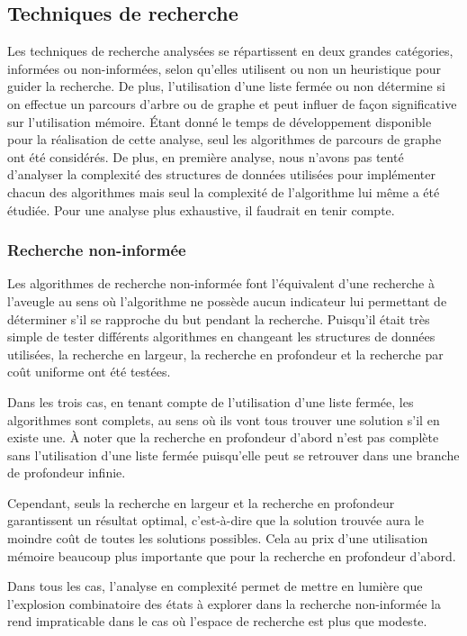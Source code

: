 \documentclass[12pt,english,frenchb,letterpaper]{article}
\begin{document}
\subsection{Techniques de recherche}
Les techniques de recherche analysées se répartissent en deux grandes catégories, informées ou non-informées, selon qu'elles utilisent ou non un heuristique pour guider la recherche.  De plus, l'utilisation d'une liste fermée ou non détermine si on effectue un parcours d'arbre ou de graphe et peut influer de fa\c con significative sur l'utilisation mémoire.  Étant donné le temps de développement disponible pour la réalisation de cette analyse, seul les algorithmes de parcours de graphe ont été considérés.  De plus, en première analyse, nous n'avons pas tenté d'analyser la complexité des structures de données utilisées pour implémenter chacun des algorithmes mais seul la complexité de l'algorithme lui même a été étudiée.  Pour une analyse plus exhaustive, il faudrait en tenir compte.

\subsubsection{Recherche non-informée}
Les algorithmes de recherche non-informée font l'équivalent d'une recherche à l'aveugle au sens où l'algorithme ne possède aucun indicateur lui permettant de déterminer s'il se rapproche du but pendant la recherche.  Puisqu'il était très simple de tester différents algorithmes en changeant les structures de données utilisées, la recherche en largeur, la recherche en profondeur et la recherche par coût uniforme ont été testées.

Dans les trois cas, en tenant compte de l'utilisation d'une liste fermée, les algorithmes sont complets, au sens où ils vont tous trouver une solution s'il en existe une. À noter que la recherche en profondeur d'abord n'est pas complète sans l'utilisation d'une liste fermée puisqu'elle peut se retrouver dans une branche de profondeur infinie.

Cependant, seuls la recherche en largeur et la recherche en profondeur garantissent un résultat optimal, c'est-à-dire que la solution trouvée aura le moindre coût de toutes les solutions possibles. Cela au prix d'une utilisation mémoire beaucoup plus importante que pour la recherche en profondeur d'abord.

Dans tous les cas, l'analyse en complexité permet de mettre en lumière que l'explosion combinatoire des états à explorer dans la recherche non-informée la rend impraticable dans le cas où l'espace de recherche est plus que modeste.  
\end{document}
